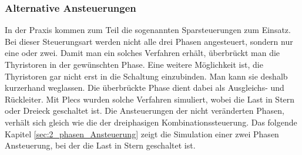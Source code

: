 \subsubsection{Alternative Ansteuerungen}\label{Spar-Ansteuerung}
In der Praxis kommen zum Teil die sogenannten Sparsteuerungen zum Einsatz. Bei dieser Steuerungsart werden nicht alle drei Phasen angesteuert, sondern nur eine oder zwei. Damit man ein solches Verfahren erhält, überbrückt man die Thyristoren in der gewünschten Phase. Eine weitere Möglichkeit ist, die Thyristoren gar nicht erst in die Schaltung einzubinden. Man kann sie deshalb kurzerhand weglassen. Die überbrückte Phase dient dabei als Ausgleichs- und Rückleiter. Mit Plecs wurden solche Verfahren simuliert, wobei die Last in Stern oder Dreieck geschaltet ist. Die Ansteuerungen der nicht veränderten Phasen, verhält sich gleich wie die der dreiphasigen Kombinationssteuerung. Das folgende Kapitel \ref{sec:2_phasen_Ansteuerung} zeigt die Simulation einer zwei Phasen Ansteuerung, bei der die Last in Stern geschaltet ist. 




